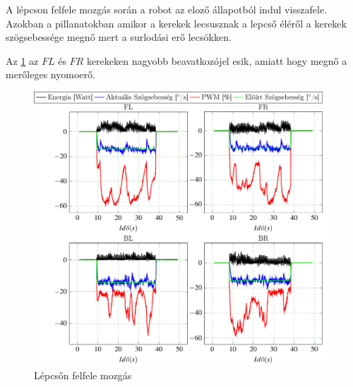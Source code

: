 A lépcson felfele mozgás során a robot az eloző állapotból indul visszafele. Azokban a pillanatokban amikor a kerekek lecsusznak a lepcső éléről a kerekek szögsebessége megnő mert a surlodási erő lecsökken.  

Az \ref{fig:LepcsoFelxx} az $FL$ és $FR$ kerekeken nagyobb beavatkozójel esik, amiatt hogy megnő a merőleges nyomoerő.

\begin{figure}[H]
  \includegraphics{tikz/LepcsoFelxx.pdf}
  \caption{Lépcsőn felfele mozgás}
  \label{fig:LepcsoFelxx}
\end{figure}















